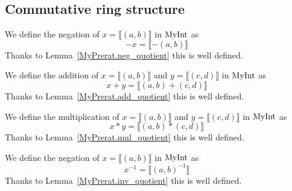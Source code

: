 \subsection{Commutative ring structure}

\begin{definition}
    \label{MyRat.neg}
    \leanok
We define the negation of $x = \llbracket (a, b) \rrbracket$ in $\mathrm{MyInt}$ as
\[
-x = \llbracket -(a, b) \rrbracket
\]
Thanks to Lemma~\ref{MyPrerat.neg_quotient} this is well defined.
\end{definition}

\begin{definition}
    \label{MyRat.add}
    \leanok
We define the addition of $x = \llbracket (a, b) \rrbracket$ and $y = \llbracket (c, d) \rrbracket$ in $\mathrm{MyInt}$ as
\[
x + y = \llbracket (a,b)+(c,d) \rrbracket
\]
Thanks to Lemma~\ref{MyPrerat.add_quotient} this is well defined.
\end{definition}

\begin{definition}
    \label{MyRat.mul}
    \leanok
We define the multiplication of $x = \llbracket (a, b) \rrbracket$ and $y = \llbracket (c, d) \rrbracket$ in $\mathrm{MyInt}$ as
\[
x * y = \llbracket (a, b)*(c,d) \rrbracket
\]
Thanks to Lemma~\ref{MyPrerat.mul_quotient} this is well defined.
\end{definition}

\begin{definition}
    \label{MyRat.inv}
    \leanok
We define the negation of $x = \llbracket (a, b) \rrbracket$ in $\mathrm{MyInt}$ as
\[
x^{-1} = \llbracket (a, b)^{-1} \rrbracket
\]
Thanks to Lemma~\ref{MyPrerat.inv_quotient} this is well defined.
\end{definition}

